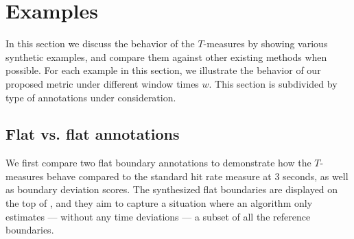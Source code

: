 \documentclass{article}
\begin{document}




\section{Examples}\label{sec:examples}

In this section we discuss the behavior of the $T$-measures by showing various synthetic examples, and compare them against other existing methods when possible.
For each example in this section, we illustrate the behavior of our proposed metric under different window times $w$.
This section is subdivided by type of annotations under consideration.

\subsection{Flat vs. flat annotations}

We first compare two flat boundary annotations to demonstrate how the $T$-measures behave compared to the standard hit rate measure at 3 seconds, as well as boundary deviation scores.
The synthesized flat boundaries are displayed on the top of , and they aim to capture a situation where an algorithm only estimates --- without any time deviations --- a subset of all the reference boundaries.
\end{document}
